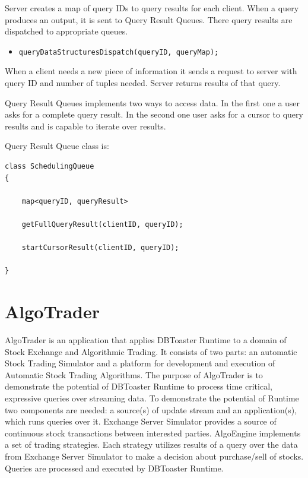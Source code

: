 \documentclass[14pt]{article}
\begin{document}
\noindent Server creates a map of query IDs to query results for each client. When a query produces an output, it is sent to Query Result Queues. There query results are dispatched to appropriate queues.

\begin{itemize}
	\item {\tt queryDataStructuresDispatch(queryID, queryMap);}
\end{itemize}

\noindent When a client needs a new piece of information it sends a request to server with query ID and number of tuples needed.  Server returns  results of that query. 

Query Result Queues implements two ways to access data. In the first one a user asks for a complete query result. In the second one user asks for a cursor to query results and is capable to iterate over results.

Query Result Queue class is:

\begin{verbatim}
class SchedulingQueue
{
    
	map<queryID, queryResult>
	
	getFullQueryResult(clientID, queryID);
	
	startCursorResult(clientID, queryID);
	
}
\end{verbatim}








\section{AlgoTrader}

AlgoTrader is an application that applies DBToaster Runtime to a domain of Stock Exchange and Algorithmic Trading. It consists of two parts: an automatic Stock Trading Simulator and a platform for development and execution of Automatic Stock Trading Algorithms. The purpose of AlgoTrader is to demonstrate the potential of DBToaster Runtime to process time critical, expressive queries over streaming data. To demonstrate the potential of Runtime two components are needed: a source(s) of update stream and an application(s), which runs queries over it. Exchange Server Simulator provides a source of continuous stock transactions between interested parties. AlgoEngine implements a set of trading strategies. Each strategy utilizes results of a query over the data from Exchange Server Simulator to make a decision about purchase/sell of stocks. Queries are processed and executed by DBToaster Runtime.
  
\end{document}
